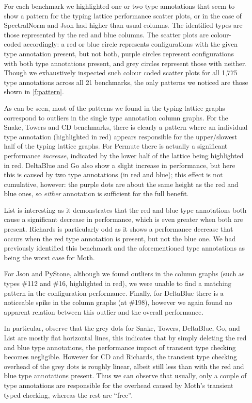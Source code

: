\documentclass[sigplan,screen]{acmart}
\begin{document}
For each benchmark we highlighted one or two type annotations that seem to show a pattern for the typing lattice performance scatter plots, or in the case of SpectralNorm and Json had higher than usual columns. The identified types are those represented by the red and blue columns. The scatter plots are colour-coded accordingly: a red or blue circle represents configurations with the given type annotation present, but not both, purple circles represent configurations with both type annotations present, and grey circles represent those with neither. Though we exhaustively inspected such colour coded scatter plots for all 1,775 type annotations across all 21 benchmarks, the only patterns we noticed are those shown in \ref{f:pattern}.

As can be seen, most of the patterns we found in the typing lattice graphs correspond to outliers in the single type annotation column graphs. For the Snake, Towers and CD benchmarks, there is clearly a pattern where an individual type annotation (highlighted in red) appears responsible for the upper/slowest half of the typing lattice graphs. For Permute there is actually a significant performance \emph{increase}, indicated by the lower half of the lattice being highlighted in red. DeltaBlue and Go also show a slight increase in performance, but here this is caused by two type annotations (in red and blue); this effect is not cumulative, however: the purple dots are about the same height as the red and blue ones, so \emph{either} annotation is sufficient for the full benefit.

List is interesting as it demonstrates that the red and blue type annotations both cause a significant decrease in performance, which is even greater when both are present. Richards is particularly odd as it shows a performance decrease that occurs when the red type annotation is present, but not the blue one. We had previously identified this benchmark and the aforementioned type annotations \cite{roberts-and-co-ecoop-2019} as being the worst case for Moth.

For Json and PyStone, although we found outliers in the column graphs (such as types \#112 and \#16, highlighted in red), we were unable to find a matching pattern in the configuration performance.
Finally, for DeltaBlue there is a noticeable spike in the column graphs (at \#198), however we again found no apparent relation between this outlier and the overall performance.

In particular, observe that the grey dots for Snake, Towers, DeltaBlue, Go, and List are mostly flat horizontal lines, this indicates that by simply deleting the red and blue type annotations, the performance impact of transient type checking becomes negligible. However for CD and Richards, the transient type checking overhead of the grey dots is roughly linear, albeit still less than with the red and blue type annotations present. Thus we can observe that usually, only a couple of type annotations are responsible for the overhead caused by Moth's transient typed checking, whereas the rest are ``free''.
\end{document}
